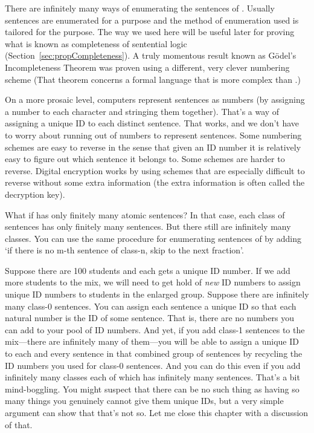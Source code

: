 There are infinitely many ways of enumerating the sentences of \lL{}.  Usually 
sentences are enumerated for a purpose and the method of enumeration used is 
tailored for the purpose.  The way we used here will be useful later for proving 
what is known as completeness of sentential logic               
(Section~\ref{sec:propCompleteness}).   A truly momentous result known as 
G\"odel's Incompleteness Theorem was proven using a different, very clever 
numbering scheme (That theorem concerns a formal language that is more complex 
than \lL{}.)

On a more prosaic level, computers represent sentences as  numbers (by assigning 
a number to each character and stringing them together).  That's a way of 
assigning a unique ID to each distinct sentence. That works, and we don't have 
to worry about running out of numbers to represent sentences. Some numbering 
schemes are easy to reverse in the sense that given an ID number it is 
relatively easy to figure out which sentence it belongs to. Some schemes are 
harder to reverse. Digital encryption works by using schemes that are especially 
difficult to reverse without some extra information (the extra information is 
often called the decryption key). 

What if \lL{} has only finitely many atomic sentences? In that case, each class 
of sentences has only finitely many sentences. But there still are infinitely 
many classes. You can use the same procedure for enumerating sentences of \lL{} 
by adding `if there is no m-th sentence of class-n, skip to the next fraction'.

Suppose there are 100 students and each gets a unique ID number. If we add more 
students to the mix, we will need to get hold of \emph{new} ID numbers to assign 
unique ID numbers to students in the enlarged group. Suppose there are 
infinitely many class-0 sentences. You can assign each sentence a unique ID so 
that each natural number is the ID of some sentence. That is, there are no 
numbers you can add to your pool of ID numbers.  And yet, if you add class-1 
sentences to the mix---there are infinitely many of them---you will be able to 
assign a unique ID to each and every sentence in that combined group of 
sentences by recycling the ID numbers you used for class-0 sentences.  And you 
can do this even if you add infinitely many classes each of which has infinitely 
many sentences. That's a bit mind-boggling. You might suspect that there can be 
no such thing as having so many things you genuinely cannot give them unique IDs, 
but a very simple argument can show that that's not so. Let me close this 
chapter with a discussion of that.



